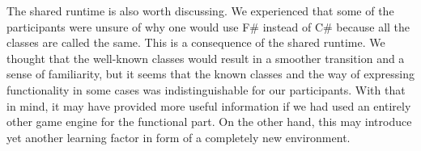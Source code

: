 The shared runtime is also worth discussing. We experienced that some of the participants were unsure of why one would use F\# instead of C\# because all the classes are called the same. This is a consequence of the shared runtime. We thought that the well-known classes would result in a smoother transition and a sense of familiarity, but it seems that the known classes and the way of expressing functionality in some cases was indistinguishable for our participants. With that in mind, it may have provided more useful information if we had used an entirely other game engine for the functional part. On the other hand, this may introduce yet another learning factor in form of a completely new environment.